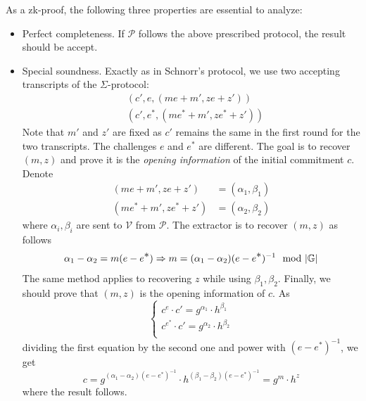 \documentclass{article}
\begin{document}
As a zk-proof, the following three properties are essential to analyze:
\begin{itemize}
\item Perfect completeness. If $\mathcal{P}$ follows the above prescribed protocol, the result should be accept. 
\item Special soundness. Exactly as in Schnorr's protocol, we use two accepting transcripts of the $\Sigma$-protocol:
\begin{align*}
& (c', e, (me + m', ze + z')) \\
& (c', e^{\displaystyle *}, (me^{\displaystyle *} + m', ze^{\displaystyle *} + z'))
\end{align*}
Note that $m'$ and $z'$ are fixed as $c'$ remains the same in the first round for the two transcripts. The challenges $e$ and $e^{\displaystyle *}$ are different. The goal is to recover $(m, z)$ and prove it is the \textit{opening information} of the initial commitment $c$. Denote 
\begin{equation*}
\begin{split}
(me + m', ze + z') &= (\alpha_1, \beta_1) \\
(me^{\displaystyle *} + m', ze^{\displaystyle *} + z') &= (\alpha_2, \beta_2)
\end{split}
\end{equation*}
where $\alpha_i, \beta_i$ are sent to $\mathcal{V}$ from $\mathcal{P}$. The extractor is to recover $(m, z)$ as follows
\begin{equation*}
\alpha_1 - \alpha_2 = m (e - e^{\displaystyle *}) \Rightarrow m = (\alpha_1 - \alpha_2)(e - e^{\displaystyle *})^{-1} \mod \abs{\mathbb{G}}
\end{equation*}
The same method applies to recovering $z$ while using $\beta_1, \beta_2$. Finally, we should prove that $(m, z)$ is the opening information of $c$. As
\begin{equation*}
\begin{cases}
c^{e} \cdot c' = g^{\alpha_1} \cdot h^{\beta_1} \\
c^{e^{\displaystyle *}} \cdot c' = g^{\alpha_{2}} \cdot h^{\beta_{2}} \\
\end{cases}
\end{equation*}
dividing the first equation by the second one and power with $(e - e^{\displaystyle *})^{-1}$, we get
\begin{equation*}
c = g^{(\alpha_1 - \alpha_2) (e - e^{\displaystyle *})^{-1}} \cdot h^{(\beta_1 - \beta_2)(e - e^{\displaystyle *})^{-1}} = g^{m} \cdot h^z 
\end{equation*}
where the result follows.


\end{itemize}
\end{document}
